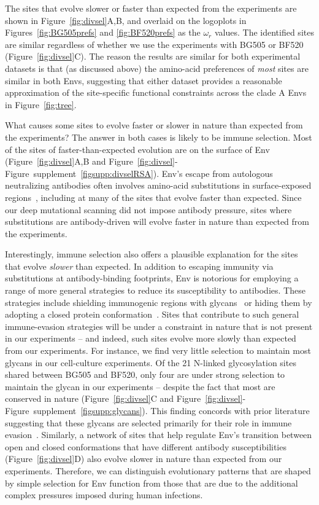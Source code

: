 \documentclass[9pt]{elife}
\begin{document}
The sites that evolve slower or faster than expected from the experiments are shown in Figure~\ref{fig:divsel}A,B, and overlaid on the logoplots in Figures~\ref{fig:BG505prefs} and \ref{fig:BF520prefs} as the $\omega_r$ values.
The identified sites are similar regardless of whether we use the experiments with BG505 or BF520 (Figure~\ref{fig:divsel}C).
The reason the results are similar for both experimental datasets is that (as discussed above) the amino-acid preferences of \emph{most} sites are similar in both Envs, suggesting that either dataset provides a reasonable approximation of the site-specific functional constraints across the clade A Envs in Figure~\ref{fig:tree}.

What causes some sites to evolve faster or slower in nature than expected from the experiments?
The answer in both cases is likely to be immune selection.
Most of the sites of faster-than-expected evolution are on the surface of Env (Figure~\ref{fig:divsel}A,B and Figure~\ref{fig:divsel}-Figure~supplement~\ref{figsupp:divselRSA}).
Env's escape from autologous neutralizing antibodies often involves amino-acid substitutions in surface-exposed regions~\citep{moore2009specificity}, including at many of the sites that evolve faster than expected.
Since our deep mutational scanning did not impose antibody pressure, sites where substitutions are antibody-driven will evolve faster in nature than expected from the experiments.

Interestingly, immune selection also offers a plausible explanation for the sites that evolve \emph{slower} than expected.
In addition to escaping immunity via substitutions at antibody-binding footprints, Env is notorious for employing a range of more general strategies to reduce its susceptibility to antibodies.
These strategies include shielding immunogenic regions with glycans~\citep{wei2003antibody,stewart2016trimeric,gristick2016natively} or hiding them by adopting a closed protein conformation~\citep{kwong2002hiv,guttman2015antibody,ozorowski2017open}.
Sites that contribute to such general immune-evasion strategies will be under a constraint in nature that is not present in our experiments -- and indeed, such sites evolve more slowly than expected from our experiments.
For instance, we find very little selection to maintain most glycans in our cell-culture experiments.
Of the 21 N-linked glycosylation sites shared between BG505 and BF520, only four are under strong selection to maintain the glycan in our experiments -- despite the fact that most are conserved in nature (Figure~\ref{fig:divsel}C and Figure~\ref{fig:divsel}-Figure~supplement~\ref{figsupp:glycans}). 
This finding concords with prior literature suggesting that these glycans are selected primarily for their role in immune evasion~\citep{pugach2004prolonged,wang2013systematic,rathore2017glycosylation}. 
Similarly, a network of sites that help regulate Env's transition between open and closed conformations that have different antibody susceptibilities (Figure~\ref{fig:divsel}D) also evolve slower in nature than expected from our experiments.
Therefore, we can distinguish evolutionary patterns that are shaped by simple selection for Env function from those that are due to the additional complex pressures imposed during human infections. 
\end{document}
